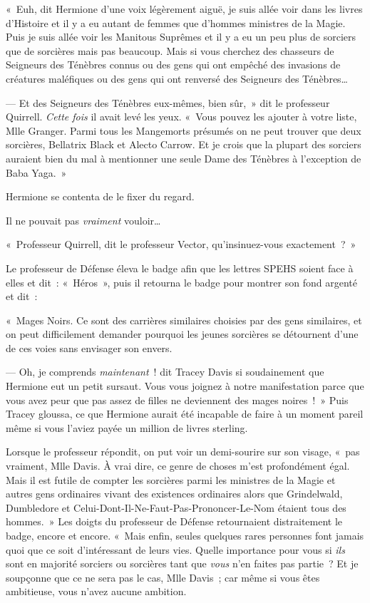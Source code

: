 «~Euh, dit Hermione d'une voix légèrement aiguë, je suis allée voir dans les livres d'Histoire et il y a eu autant de femmes que d'hommes ministres de la Magie. Puis je suis allée voir les Manitous Suprêmes et il y a eu un peu plus de sorciers que de sorcières mais pas beaucoup. Mais si vous cherchez des chasseurs de Seigneurs des Ténèbres connus ou des gens qui ont empêché des invasions de créatures maléfiques ou des gens qui ont renversé des Seigneurs des Ténèbres…

--- Et des Seigneurs des Ténèbres eux-mêmes, bien sûr,~» dit le professeur Quirrell. \emph{Cette fois} il avait levé les yeux. «~Vous pouvez les ajouter à votre liste, Mlle Granger. Parmi tous les Mangemorts présumés on ne peut trouver que deux sorcières, Bellatrix Black et Alecto Carrow. Et je crois que la plupart des sorciers auraient bien du mal à mentionner une seule Dame des Ténèbres à l'exception de Baba Yaga.~»

Hermione se contenta de le fixer du regard.

Il ne pouvait pas \emph{vraiment} vouloir…

«~Professeur Quirrell, dit le professeur Vector, qu'insinuez-vous exactement~?~»

Le professeur de Défense éleva le badge afin que les lettres SPEHS soient face à elles et dit~: «~Héros~», puis il retourna le badge pour montrer son fond argenté et dit~:

«~Mages Noirs. Ce sont des carrières similaires choisies par des gens similaires, et on peut difficilement demander pourquoi les jeunes sorcières se détournent d'une de ces voies sans envisager son envers.

--- Oh, je comprends \emph{maintenant}~! dit Tracey Davis si soudainement que Hermione eut un petit sursaut. Vous vous joignez à notre manifestation parce que vous avez peur que pas assez de filles ne deviennent des mages noires~!~» Puis Tracey gloussa, ce que Hermione aurait été incapable de faire à un moment pareil même si vous l'aviez payée un million de livres sterling.

Lorsque le professeur répondit, on put voir un demi-sourire sur son visage, «~pas vraiment, Mlle Davis. À vrai dire, ce genre de choses m'est profondément égal. Mais il est futile de compter les sorcières parmi les ministres de la Magie et autres gens ordinaires vivant des existences ordinaires alors que Grindelwald, Dumbledore et Celui-Dont-Il-Ne-Faut-Pas-Prononcer-Le-Nom étaient tous des hommes.~» Les doigts du professeur de Défense retournaient distraitement le badge, encore et encore. «~Mais enfin, seules quelques rares personnes font jamais quoi que ce soit d'intéressant de leurs vies. Quelle importance pour vous si \emph{ils} sont en majorité sorciers ou sorcières tant que \emph{vous} n'en faites pas partie~? Et je soupçonne que ce ne sera pas le cas, Mlle Davis~; car même si vous êtes ambitieuse, vous n'avez aucune ambition.

